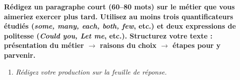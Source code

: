 \documentclass[11pt]{article}
\begin{document}
\begin{exercice}
\textbf{Rédigez un paragraphe court (60--80 mots) sur le métier que vous aimeriez exercer plus tard. Utilisez au moins \textbf{trois} quantificateurs étudiés (\textit{some, many, each, both, few}, etc.) et \textbf{deux} expressions de politesse (\textit{Could you, Let me}, etc.). Structurez votre texte : présentation du métier $\rightarrow$ raisons du choix $\rightarrow$ étapes pour y parvenir.}
\begin{enumerate}
    \item \textit{Rédigez votre production sur la feuille de réponse.}
\end{enumerate}
\end{exercice}
\end{document}
